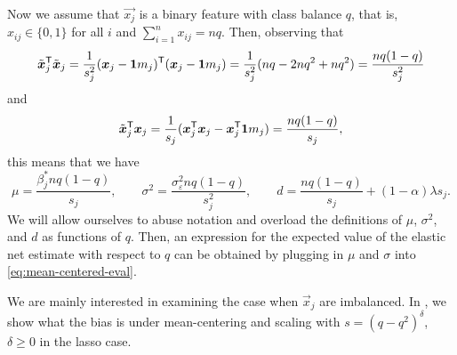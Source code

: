 Now we assume that \(\vec{x_j}\) is a binary feature with class balance \(q\), that is, \(x_{ij} \in \{0, 1\}\) for all \(i\) and \(\sum_{i=1}^n x_{ij} = nq\). Then, observing that
\[
  \tilde{\boldsymbol{x}}_j^{\mathsf{T}} \tilde{\boldsymbol{x}}_j = \frac{1}{s_j^2}(\boldsymbol{x}_j - \boldsymbol{1} m_j)^{\mathsf{T}} (\boldsymbol{x}_j - \boldsymbol{1} m_j) = \frac{1}{s^2_j}(nq - 2nq^2 + nq^2) = \frac{nq(1-q)}{s^2_j}
\]
and
\[
  \tilde{\boldsymbol{x}}_j^{\mathsf{T}} \boldsymbol{x}_j = \frac{1}{s_j}(\boldsymbol{x}_j^{\mathsf{T}} \boldsymbol{x}_j - \boldsymbol{x}_j^{\mathsf{T}} \boldsymbol{1} m_j) = \frac{nq(1 - q)}{s_j},
\]
this means that we have
\[
  \mu = \frac{\beta^*_j nq(1 - q)}{s_j}, \qquad \sigma^2 = \frac{\sigma_\varepsilon^2nq(1 - q)}{s^2_j}, \qquad d = \frac{nq(1 -q)}{s_j}  + (1-\alpha)\lambda s_j.
\]
We will allow ourselves to abuse notation and overload the definitions of \(\mu\), \(\sigma^2\), and \(d\) as functions of \(q\). Then, an expression for the expected value of the elastic net estimate with respect to \(q\) can be obtained by plugging in \(\mu\) and \(\sigma\) into \eqref{eq:mean-centered-eval}.

We are mainly interested in examining the case when \(\vec{x}_j\) are imbalanced. In , we show what the
bias is under mean-centering and scaling with \(s = (q - q^2)^\delta\), \(\delta \geq 0\) in the lasso case.

